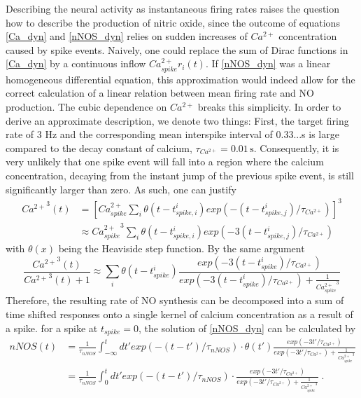 \documentclass[10pt,a4paper]{article}
\begin{document}
Describing the neural activity as instantaneous firing rates raises the question how to describe the production of nitric oxide, since the outcome of equations \eqref{Ca_dyn} and \eqref{nNOS_dyn} relies on sudden increases of $Ca^{2+}$ concentration caused by spike events. Naively, one could replace the sum of Dirac functions in \eqref{Ca_dyn} by a continuous inflow $Ca^{2+}_{spike} r_i(t)$. If \eqref{nNOS_dyn} was a linear homogeneous differential equation, this approximation would indeed allow for the correct calculation of a linear relation between mean firing rate and NO production. The cubic dependence on $Ca^{2+}$ breaks this simplicity. In order to derive an approximate description, we denote two things: First, the target firing rate of 3 Hz and the corresponding mean interspike interval of 0.33...s is large compared to the decay constant of calcium, $\tau_{Ca^{2+}} = \mathrm{0.01\,s}$. Consequently, it is very unlikely that one spike event will fall into a region where the calcium concentration, decaying from the instant jump of the previous spike event, is still significantly larger than zero. As such, one can justify
\begin{equation}
\begin{split}
{Ca^{2+}}^3(t) &= \left[ Ca^{2+}_{spike} \sum_{i} \theta(t-t^i_{spike,i}) exp(-(t-t^i_{spike,j})/\tau_{Ca^{2+}}) \right]^3 \\
&\approx {Ca^{2+}_{spike}}^3 \sum_{i} \theta(t-t^i_{spike,i}) exp(-3(t-t^i_{spike,j})/\tau_{Ca^{2+}})
\end{split} \label{cubic_approx_1}			
\end{equation}
with $\theta(x)$ being the Heaviside step function. By the same argument
\begin{equation}
\frac{{Ca^{2+}}^3(t)}{{Ca^{2+}}^3(t)+1} \approx \sum_{i} \theta(t-t^i_{spike}) \frac{exp(-3(t-t^i_{spike})/\tau_{Ca^{2+}})}{exp(-3(t-t^i_{spike})/\tau_{Ca^{2+}}) + \frac{1}{{Ca^{2+}_{spike}}^3}}  
\end{equation}
Therefore, the resulting rate of NO synthesis can be decomposed into a sum of time shifted responses onto a single kernel of calcium concentration as a result of a spike. for a spike at $t_{spike}=0$, the solution of \eqref{nNOS_dyn} can be calculated by
\begin{equation}
\begin{split}
nNOS(t) &= \frac{1}{\tau_{nNOS}}\int_{-\infty}^t dt' exp(-(t-t')/\tau_{nNOS})\cdot \theta(t') \frac{exp(-3t'/\tau_{Ca^{2+}})}{exp(-3t'/\tau_{Ca^{2+}}) + \frac{1}{{Ca^{2+}_{spike}}^3}} \\
&= \frac{1}{\tau_{nNOS}}\int_{0}^t dt' exp(-(t-t')/\tau_{nNOS})\cdot \frac{exp(-3t'/\tau_{Ca^{2+}})}{exp(-3t'/\tau_{Ca^{2+}}) + \frac{1}{{Ca^{2+}_{spike}}^3}}\;.
\end{split}\label{nNOS_single_sol}
\end{equation}
\end{document}
